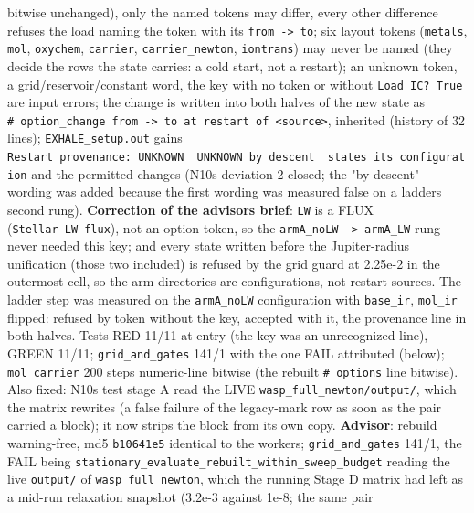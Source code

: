 \documentclass[english,a4paper]{my_memo}
\begin{document}
\begin{itemize}
  bitwise unchanged), only the named tokens may differ, every other
  difference refuses the load naming the token with its \texttt{from\ -\textgreater{}\ to}; six
  layout tokens (\texttt{metals}, \texttt{mol}, \texttt{oxychem}, \texttt{carrier}, \texttt{carrier\_newton},
  \texttt{iontrans}) may never be named (they decide the rows the state carries: a
  cold start, not a restart); an unknown token, a grid/reservoir/constant
  word, the key with no token or without \texttt{Load\ IC?\ True} are input errors;
  the change is written into both halves of the new state as
  \texttt{\#\ option\_change\ from\ -\textgreater{}\ to\ at\ restart\ of\ \textless{}source\textgreater{}}, inherited (history of
  32 lines); \texttt{EXHALE\_setup.out} gains \texttt{Restart\ provenance:\ UNKNOWN\ \textbar{}\ UNKNOWN\ by\ descent\ \textbar{}\ states\ its\ configuration} and the permitted changes (N10\textquotesingle s
  deviation 2 closed; the "by descent" wording was added because the first
  wording was measured false on a ladder\textquotesingle s second rung). \textbf{Correction of
  the advisor\textquotesingle s brief}: \texttt{LW} is a FLUX (\texttt{Stellar\ LW\ flux}), not an option
  token, so the \texttt{armA\_noLW\ -\textgreater{}\ armA\_LW} rung never needed this key; and every
  state written before the Jupiter-radius unification (those two included)
  is refused by the grid guard at 2.25e-2 in the outermost cell, so the arm
  directories are configurations, not restart sources. The ladder step was
  measured on the \texttt{armA\_noLW} configuration with \texttt{base\_ir}, \texttt{mol\_ir} flipped:
  refused by token without the key, accepted with it, the provenance line
  in both halves. Tests RED 11/11 at entry (the key was an unrecognized
  line), GREEN 11/11; \texttt{grid\_and\_gates} 141/1 with the one FAIL attributed
  (below); \texttt{mol\_carrier} 200 steps numeric-line bitwise (the rebuilt
  \texttt{\#\ options} line bitwise). Also fixed: N10\textquotesingle s test stage A read the LIVE
  \texttt{wasp\_full\_newton/output/}, which the matrix rewrites (a false failure of
  the legacy-mark row as soon as the pair carried a block); it now strips
  the block from its own copy. \textbf{Advisor}: rebuild warning-free, md5
  \texttt{b10641e5} identical to the worker\textquotesingle s; \texttt{grid\_and\_gates} 141/1, the FAIL
  being \texttt{stationary\_evaluate\_rebuilt\_within\_sweep\_budget} reading the live
  \texttt{output/} of \texttt{wasp\_full\_newton}, which the running Stage D matrix had left
  as a mid-run relaxation snapshot (3.2e-3 against 1e-8; the same pair

\end{itemize}
\end{document}

